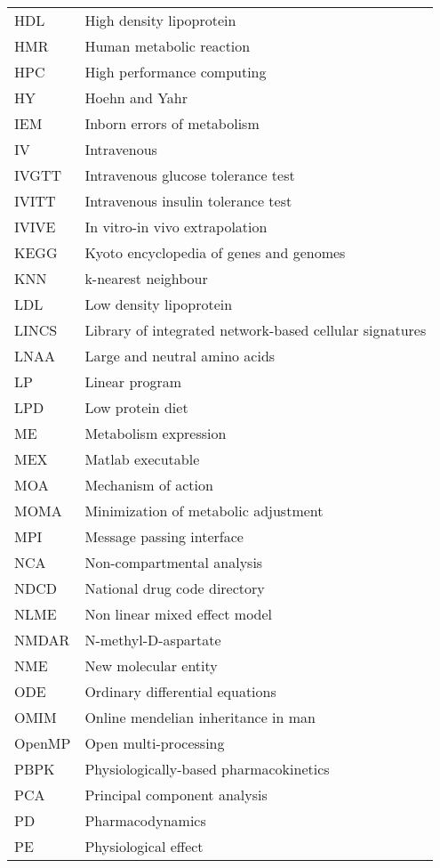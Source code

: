 \clearpage
\begin{table}[h]
	\begin{tabular}{l l} 
	HDL & High density lipoprotein\\
	HMR & Human metabolic reaction\\
	HPC & High performance computing\\
	HY & Hoehn and Yahr\\
    IEM & Inborn errors of metabolism\\
	IV & Intravenous\\
	IVGTT & Intravenous glucose tolerance test\\
	IVITT & Intravenous insulin tolerance test\\
	IVIVE & In vitro-in vivo extrapolation\\
	KEGG & Kyoto encyclopedia of genes and genomes\\
	KNN & k-nearest neighbour\\
	LDL & Low density lipoprotein\\
	LINCS & Library of integrated network-based cellular signatures\\
	LNAA & Large and neutral amino acids\\
	LP  & Linear program \\
	LPD & Low protein diet\\
	ME & Metabolism expression\\
	MEX & Matlab executable\\
	MOA & Mechanism of action\\
	MOMA & Minimization of metabolic adjustment\\
	MPI & Message passing interface\\
	NCA & Non-compartmental analysis\\
	NDCD & National drug code directory \\
	NLME & Non linear mixed effect model\\
	NMDAR & N-methyl-D-aspartate\\
	NME & New molecular entity\\
	ODE & Ordinary differential equations\\
	OMIM & Online mendelian inheritance in man\\
	OpenMP & Open multi-processing\\
	PBPK	&	Physiologically-based pharmacokinetics	\\
	PCA & Principal component analysis\\
	PD & Pharmacodynamics \\
	PE & Physiological effect\\

\end{tabular}
\end{table}
